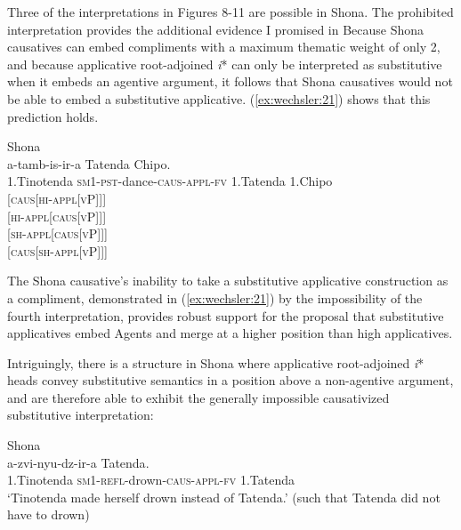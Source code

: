 \documentclass[output=paper,modfonts,nonflat,colorlinks,citecolor=brown]{langsci/langscibook}
\begin{document}
Three of the interpretations in Figures 8-11 are possible in Shona. The prohibited interpretation provides the additional evidence I promised in  Because Shona causatives can embed compliments with a maximum thematic weight of only 2, and because applicative root-adjoined \textit{i}* can only be interpreted as substitutive when it embeds an agentive argument, it follows that Shona causatives would not be able to embed a substitutive applicative. (\ref{ex:wechsler:21}) shows that this prediction holds. 


\ea\label{ex:wechsler:21}
Shona\\
  {a-tamb-is-ir-a}                                                                      {Tatenda} {Chipo}.\\
1.Tinotenda  \textsc{sm1-pst}{}-dance-\textsc{caus-appl-fv}  1.Tatenda  1.Chipo\\

   \textsc{[caus[hi-appl[vP]]]}\\
  \textsc{[hi-appl[caus[vP]]]}\\
  \textsc{[sh-appl[caus[vP]]]}\\
  {\textsc{[caus[sh-appl[vP]]]}}\\
\z


The Shona causative’s inability to take a substitutive applicative construction as a compliment, demonstrated in (\ref{ex:wechsler:21}) by the impossibility of the fourth interpretation, provides robust support for the proposal that substitutive applicatives embed Agents and merge at a higher position than high applicatives. 



Intriguingly, there is a structure in Shona where applicative root-adjoined \textit{i}* heads convey substitutive semantics in a position above a non-agentive argument, and are therefore able to exhibit the generally impossible causativized substitutive interpretation:


\ea\label{ex:wechsler:22}
Shona\\
  {a-zvi-nyu-dz-ir-a} {Tatenda}.\\
1.Tinotenda  \textsc{sm1-refl-}drown\textsc{{}-caus-appl-fv}  1.Tatenda\\
\glt ‘Tinotenda made herself drown instead of Tatenda.'
(such that Tatenda did not have to drown)\\
\z
\end{document}
